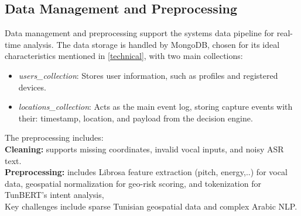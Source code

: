 \documentclass[12pt,a4paper,oneside,english]{book}
\begin{document}
\subsection{Data Management and Preprocessing}
\label{sec:data_management}
Data management and preprocessing support the systems data pipeline for real-time analysis.
The data storage is handled by MongoDB, chosen for its ideal characteristics mentioned in \ref{technical}, with two main collections:
\begin{itemize}
    \item \textit{users\_collection}: Stores user information, such as profiles and registered devices.
    \item \textit{locations\_collection}: Acts as the main event log, storing capture events with their: timestamp, location, and payload from the decision engine.
\end{itemize}

The preprocessing includes: \\
\textbf{Cleaning:} supports missing coordinates, invalid vocal inputs, and noisy ASR text.\\
\textbf{Preprocessing:} includes Librosa feature extraction (pitch, energy,..) for vocal data, geospatial normalization for geo-risk scoring, and tokenization for TunBERT's intent analysis, 
\\  Key challenges include sparse Tunisian geospatial data and complex Arabic NLP.


\end{document}
